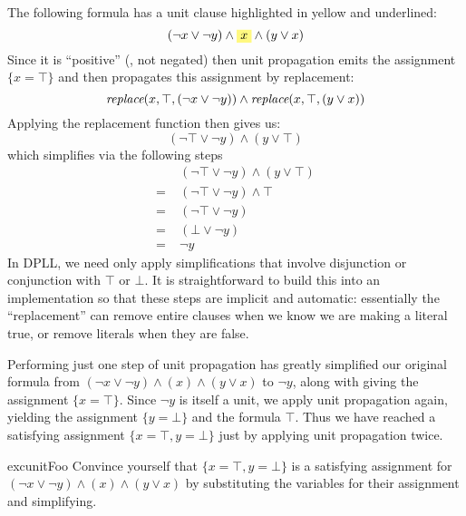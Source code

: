 \begin{example}
The following formula has a unit clause highlighted in yellow and underlined:
%
\begin{equation*}
(\neg x \vee \neg y) \wedge \highlight{x} \wedge (y \vee x)
\end{equation*}
%
Since it is ``positive'' (\ie{}, not negated) then unit propagation
emits the assignment $\{x = \top\}$ and then propagates this
assignment by replacement:
\begin{equation*}
\textit{replace}(x, \top, (\neg x \vee \neg y)) \wedge \textit{replace}(x, \top, (y \vee x))
\end{equation*}
Applying the replacement function then gives us:
%
\begin{equation*}
(\neg \top \vee \neg y) \wedge (y \vee \top)
\end{equation*}
%
which simplifies via the following steps
%
\begin{align*}
 & (\neg \top \vee \neg y) \wedge (y \vee \top) \\
= \; & (\neg \top \vee \neg y) \wedge \top \\
= \; & (\neg \top \vee \neg y) \\
= \; & (\bot \vee \neg y) \\
= \; & \neg y
\end{align*}
%
In DPLL, we need only apply simplifications that involve disjunction
or conjunction with $\top$ or $\bot$. It is straightforward to build
this into an implementation so that these steps are implicit and
automatic: essentially the ``replacement'' can remove entire clauses when
we know we are making a literal true, or remove literals when they
are false.

Performing just one step of unit propagation has greatly simplified
our original formula from $(\neg x \vee \neg y) \wedge (x)
\wedge (y \vee x)$ to $\neg y$, along with giving the assignment
$\{x = \top\}$.  Since $\neg y$ is itself a unit, we apply unit
propagation again, yielding the assignment $\{y = \bot\}$ and
the formula $\top$. Thus we have reached a satisfying assignment
$\{x = \top, y = \bot\}$ just by applying unit propagation twice.
\end{example}

\begin{restatable}{exc}{unitFoo}
Convince yourself that $\{x = \top, y = \bot\}$ is a satisfying
assignment for $(\neg x \vee \neg y) \wedge (x)
\wedge (y \vee x)$ by substituting the variables
for their assignment and simplifying.
\end{restatable}


